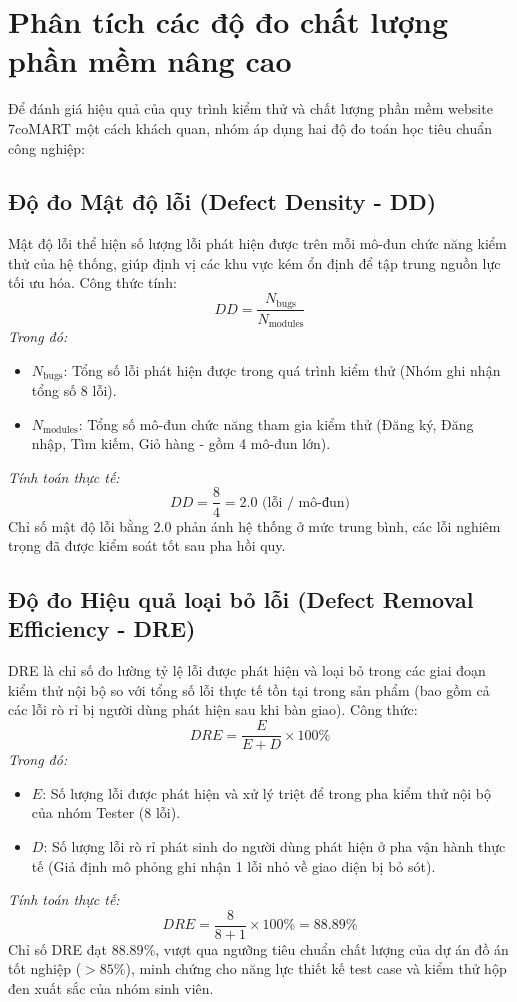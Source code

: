 \section{Phân tích các độ đo chất lượng phần mềm nâng cao}
Để đánh giá hiệu quả của quy trình kiểm thử và chất lượng phần mềm website 7coMART một cách khách quan, nhóm áp dụng hai độ đo toán học tiêu chuẩn công nghiệp:

\subsection{Độ đo Mật độ lỗi (Defect Density - DD)}
Mật độ lỗi thể hiện số lượng lỗi phát hiện được trên mỗi mô-đun chức năng kiểm thử của hệ thống, giúp định vị các khu vực kém ổn định để tập trung nguồn lực tối ưu hóa. Công thức tính:
$$DD = \frac{N_{\text{bugs}}}{N_{\text{modules}}}$$
\textit{Trong đó:}
\begin{itemize}
    \item $N_{\text{bugs}}$: Tổng số lỗi phát hiện được trong quá trình kiểm thử (Nhóm ghi nhận tổng số 8 lỗi).
    \item $N_{\text{modules}}$: Tổng số mô-đun chức năng tham gia kiểm thử (Đăng ký, Đăng nhập, Tìm kiếm, Giỏ hàng - gồm 4 mô-đun lớn).
\end{itemize}
\textit{Tính toán thực tế:}
$$DD = \frac{8}{4} = 2.0 \text{ (lỗi / mô-đun)}$$
Chỉ số mật độ lỗi bằng 2.0 phản ánh hệ thống ở mức trung bình, các lỗi nghiêm trọng đã được kiểm soát tốt sau pha hồi quy.

\subsection{Độ đo Hiệu quả loại bỏ lỗi (Defect Removal Efficiency - DRE)}
DRE là chỉ số đo lường tỷ lệ lỗi được phát hiện và loại bỏ trong các giai đoạn kiểm thử nội bộ so với tổng số lỗi thực tế tồn tại trong sản phẩm (bao gồm cả các lỗi rò rỉ bị người dùng phát hiện sau khi bàn giao). Công thức:
$$DRE = \frac{E}{E + D} \times 100\%$$
\textit{Trong đó:}
\begin{itemize}
    \item $E$: Số lượng lỗi được phát hiện và xử lý triệt để trong pha kiểm thử nội bộ của nhóm Tester (8 lỗi).
    \item $D$: Số lượng lỗi rò rỉ phát sinh do người dùng phát hiện ở pha vận hành thực tế (Giả định mô phỏng ghi nhận 1 lỗi nhỏ về giao diện bị bỏ sót).
\end{itemize}
\textit{Tính toán thực tế:}
$$DRE = \frac{8}{8 + 1} \times 100\% = 88.89\%$$
Chỉ số DRE đạt $88.89\%$, vượt qua ngưỡng tiêu chuẩn chất lượng của dự án đồ án tốt nghiệp ($>85\%$), minh chứng cho năng lực thiết kế test case và kiểm thử hộp đen xuất sắc của nhóm sinh viên.

